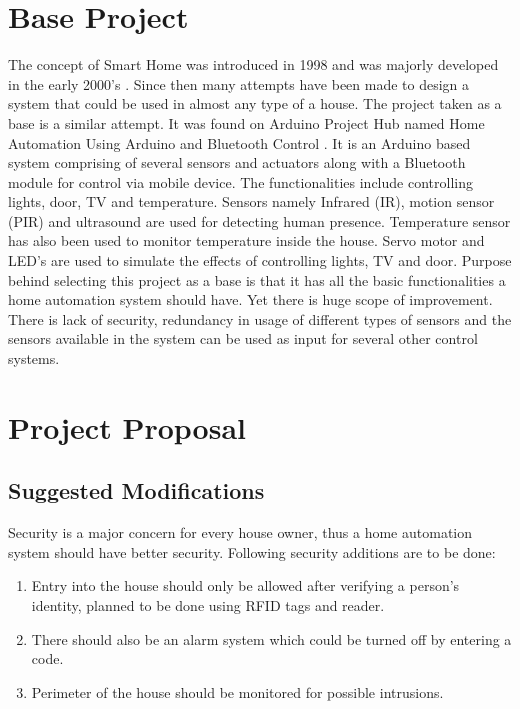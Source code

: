 \documentclass[journal]{IEEEtran}
\begin{document}
\section{Base Project}
The concept of Smart Home was introduced in 1998 and was majorly developed in the early 2000’s \textsuperscript{\cite{IEEEhowto:Hendricks}}. Since then many attempts have been made to design a system that could be used in almost any type of a house. The project taken as a base is a similar attempt. It was found on Arduino Project Hub named Home Automation Using Arduino and Bluetooth Control \textsuperscript{\cite{IEEEhowto:Kumar}}. It is an Arduino based system comprising of several sensors and actuators along with a Bluetooth module for control via mobile device. The functionalities include controlling lights, door, TV and temperature. Sensors namely Infrared (IR), motion sensor (PIR) and ultrasound are used for detecting human presence. Temperature sensor has also been used to monitor temperature inside the house. Servo motor and LED’s are used to simulate the effects of controlling lights, TV and door.
Purpose behind selecting this project as a base is that it has all the basic functionalities a home automation system should have. Yet there is huge scope of improvement. There is lack of security, redundancy in usage of different types of sensors and the sensors available in the system can be used as input for several other control systems.


\section{Project Proposal}

\subsection{Suggested Modifications}
Security is a major concern for every house owner, thus a home automation system should have better security. Following security additions are to be done:
\begin{enumerate}
    \item Entry into the house should only be allowed after verifying a person’s identity, planned to be done using RFID tags and reader.
    \item There should also be an alarm system which could be turned off by entering a code.
    \item Perimeter of the house should be monitored for possible intrusions.
\end{enumerate}
\end{document}
